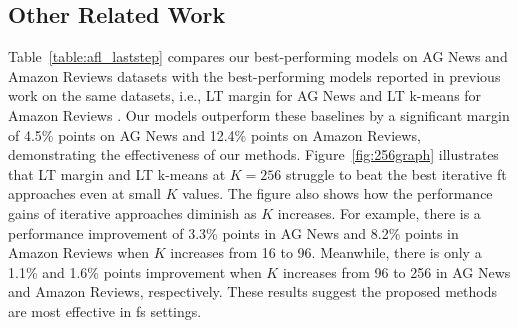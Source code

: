 \documentclass[11pt]{article}
\theoremstyle{definition}
\begin{document}
\subsection{Other Related Work}

\begin{table}[hbt]
\setlength{\tabcolsep}{4pt}
\centering
{}
\caption{The average macro-F1 (\%) results for AG News and Amazon Reviews when $M=16$ and $K=256$, calculated over five different seeds in the sampling phase. The subscripts denote standard deviation.}
\label{table:afl_laststep}
\end{table}

Table~\ref{table:afl_laststep} compares our best-performing models on AG News and Amazon Reviews datasets with the best-performing models reported in previous work on the same datasets, i.e., LT margin for AG News and LT k-means for Amazon Reviews \cite{muller2022active}. Our models outperform these baselines by a significant margin of 4.5\% points on AG News and 12.4\% points on Amazon Reviews, demonstrating the effectiveness of our methods. Figure~\ref{fig:256graph} illustrates that LT margin and LT k-means at $K=256$ struggle to beat the best iterative \gls*{ft} approaches even at small $K$ values. The figure also shows how the performance gains of iterative approaches diminish as $K$ increases. For example, there is a performance improvement of 3.3\% points in AG News and 8.2\% points in Amazon Reviews when $K$ increases from 16 to 96. Meanwhile, there is only a 1.1\% and 1.6\% points improvement when $K$ increases from 96 to 256 in AG News and Amazon Reviews, respectively. These results suggest the proposed methods are most effective in \gls*{fs} settings.
\end{document}
